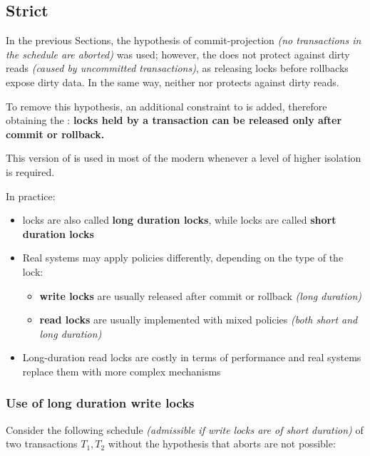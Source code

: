 \documentclass[english]{article}
\begin{document}
\subsection{Strict \TPL}

In the previous Sections, the hypothesis of commit-projection \textit{(no transactions in the schedule are aborted)} was used;
however, the \TPL does not protect against dirty reads \textit{(caused by uncommitted transactions)}, as releasing locks before rollbacks expose dirty data.
In the same way, neither \VSR nor \CSR protects against dirty reads.

To remove this hypothesis, an additional constraint to \TPL is added, therefore obtaining the \textbf{\STPL}:
\textbf{locks held by a transaction can be released only after commit or rollback.}

This version of \TPL is used in most of the modern \dbms whenever a level of higher isolation is required.

\bigskip
In practice:
\begin{itemize}
  \item \STPL locks are also called \textbf{long duration locks}, while \TPL locks are called \textbf{short duration locks}
  \item Real systems may apply \TPL policies differently, depending on the type of the lock:
        \begin{itemize}
          \item \textbf{write locks} are usually released after commit or rollback \textit{(long duration)}
          \item \textbf{read locks} are usually implemented with mixed policies \textit{(both short and long duration)}
        \end{itemize}
  \item Long-duration read locks are costly in terms of performance and real systems replace them with more complex mechanisms
\end{itemize}

\subsubsection{Use of long duration write locks}

Consider the following schedule \textit{(admissible if write locks are of short duration)} of two transactions \(T_1, T_2\) without the hypothesis that aborts are not possible:
\end{document}
